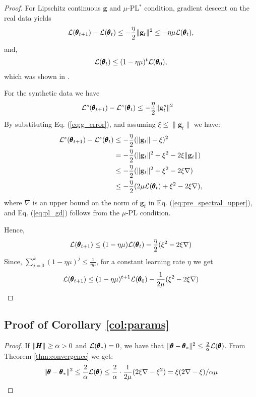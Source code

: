 \begin{proof}
For Lipschitz continuous $\mathbf{g}$ and $\mu$-PL$^*$ condition, gradient descent on the real data yields
\begin{align}
    {\mathcal{L}}(\pmb{\theta}_{t+1}) - {\mathcal{L}}(\pmb{\theta}_{t}) \leq -\frac{\eta} {2}\|\mathbf{g}_{t}\|^2 \leq -\eta\mu {\mathcal{L}}(\pmb{\theta}_{t}),
\end{align}
and,
\begin{align}
    {\mathcal{L}}(\pmb{\theta}_{t})\leq(1-\eta\mu)^t {\mathcal{L}}(\pmb{\theta}_0)\label{eq:grad_rate},
\end{align}
which was shown in \cite{liu2020toward}.

For the synthetic data we have 
    \begin{align}
        {\mathcal{L}}^s(\pmb{\theta}_{t+1}) - {\mathcal{L}}^s(\pmb{\theta}_t) 
        &\leq -\frac{\eta}{2}\|\mathbf{g}_t^s\|^2
    \end{align}    
    By substituting Eq. (\ref{eq:g_error}), and assuming $\xi \leq \|\mathbf{g}_t\|$ we have:
    \begin{align}
        {\mathcal{L}}^s(\pmb{\theta}_{t+1}) - {\mathcal{L}}^s(\pmb{\theta}_t) 
        &\leq -\frac{\eta}{2}(\|\mathbf{g}_t\|-\xi)^2\\
        &= -\frac{\eta}{2}(\|\mathbf{g}_t\|^2+\xi^2-2\xi\|\mathbf{g}_t\|)\label{eq:pre_spectral_upper}\\
        &\leq - \frac{\eta}{2}(\|\mathbf{g}_t\|^2+\xi^2-2\xi \nabla)\label{eq:pl_before_ada}\\
        &\leq -\frac{\eta}{2}(2\mu {\mathcal{L}}(\pmb{\theta}_t)+\xi^2-2\xi \nabla), \label{eq:pl_gd}
    \end{align}
    where $\nabla$ is an upper bound on the norm of $\mathbf{g}_t$ in Eq. (\ref{eq:pre_spectral_upper}), and Eq. (\ref{eq:pl_gd}) follows from the $\mu$-PL condition.
    
    
    
    Hence,
    \begin{align}
        {\mathcal{L}}(\pmb{\theta}_{t+1}) \leq (1-{\eta\mu} ) {\mathcal{L}}(\pmb{\theta}_t) - \frac{\eta} {2}(\xi^2-2\xi \nabla)
    \end{align}
    Since, $\sum_{j=0}^k(1-{\eta\mu})^j\leq\frac{1}{\eta\mu}$, for a constant learning rate $\eta$ we get
    \begin{align}
        {\mathcal{L}}(\pmb{\theta}_{t+1}) \leq (1-{\eta\mu})^{t+1} {\mathcal{L}}(\pmb{\theta}_0) - \frac{1} {2 \mu}(\xi^2-2\xi \nabla)
        \label{eq:convergence_appx}
    \end{align}
\end{proof}

\subsection{Proof of Corollary \ref{col:params}}
\begin{proof}
    If $\|\pmb{H}\|\geq\alpha>0$ and ${\mathcal{L}}(\pmb{\theta}_*)=0$, we have that $\|\pmb{\theta}-\pmb{\theta}_*\|^2 \leq \frac{2}{\alpha}{\mathcal{L}}(\pmb{\theta})$. From Theorem \ref{thm:convergence} we get:
    \begin{equation}
        \|\pmb{\theta}-\pmb{\theta}_*\|^2 \leq \frac{2}{\alpha}{\mathcal{L}}(\pmb{\theta}) \leq \frac{2}{\alpha} \cdot \frac{1} {2 \mu}(2\xi \nabla-\xi^2)=\xi(2\nabla-\xi)/\alpha\mu
    \end{equation}
\end{proof}


